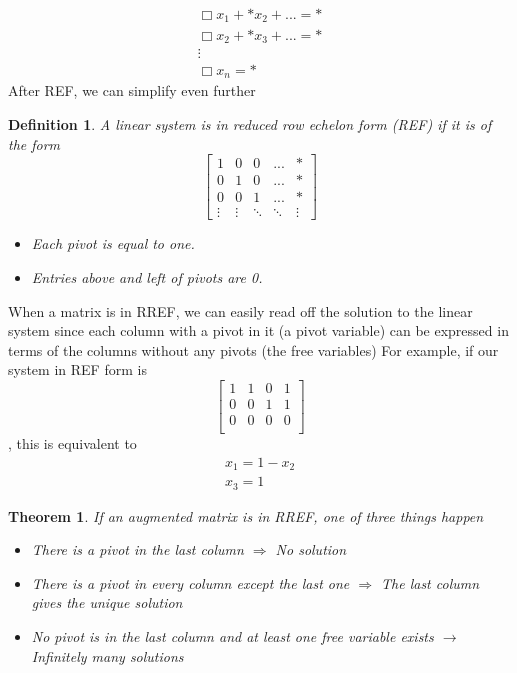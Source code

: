 \documentclass{article}
\newtheorem{theorem}{Theorem}
\newtheorem{definition}{Definition}
\begin{document}
    \[
        \begin{array}{c}
            \Box x_1 + *x_2 + ... = * \\
            \Box x_2 + *x_3 + ... = * \\
            \vdots \\
            \Box x_n = *
        \end{array}
    \]
    After REF, we can simplify even further
    \begin{definition}
        A linear system is in reduced row echelon form (REF) if it is of the form
        \[
            \left[
            \begin{array}{cccc|c}
            1 & 0 & 0 & ... & * \\
            0 & 1 & 0 & ... & * \\
            0 & 0 & 1 & ... & * \\
            \vdots & \vdots & \ddots & \ddots & \vdots
            \end{array}
            \right]
        \] 
        \begin{itemize}
            \item Each pivot is equal to one. 
            \item Entries above and left of pivots are 0.
        \end{itemize}
    \end{definition}
    When a matrix is in RREF, we can easily read off the solution to the linear system since each column with a pivot in it (a pivot variable) can be expressed in terms of the columns without any pivots (the free variables)
    For example, if our system in REF form is
    \[
        \left[
            \begin{array}{ccc|c}
                1 & 1 & 0 & 1 \\
                0 & 0 & 1 & 1 \\
                0 & 0 & 0 & 0 \\
            \end{array}
        \right]
    \], this is equivalent to 
    \[
        \begin{array}{c}
            x_1 = 1 - x_2 \\
            x_3 = 1
        \end{array}
    \]
    \begin{theorem}
        If an augmented matrix is in RREF, one of three things happen
        \begin{itemize}
            \item[1] There is a pivot in the last column $\Rightarrow$ No solution
            \item[2] There is a pivot in every column except the last one $\Rightarrow$ The last column gives the unique solution
            \item[3] No pivot is in the last column and at least one free variable exists $\rightarrow$ Infinitely many solutions
        \end{itemize}
    \end{theorem}
\end{document}

